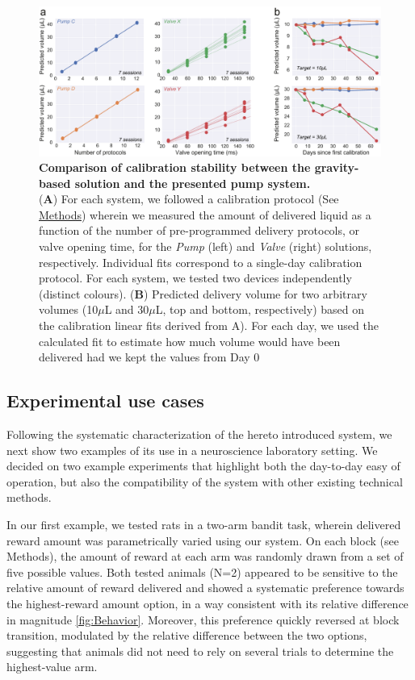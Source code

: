 \begin{figure} 
	\centering
	\includegraphics[width=1.0\linewidth]{Figures/Artboard 2.pdf}
	\caption{\textbf{Comparison of calibration stability between the gravity-based solution and the presented pump system.}\\
		(\textbf{A}) For each system, we followed a calibration protocol (See \hyperref[s:methods]{Methods}) wherein we measured the amount of delivered liquid as a function of the number of pre-programmed delivery protocols, or valve opening time, for the \textit{Pump} (left) and \textit{Valve} (right) solutions, respectively. Individual fits correspond to a single-day calibration protocol. For each system, we tested two devices independently (distinct colours). (\textbf{B}) Predicted delivery volume for two arbitrary volumes (10$\mu$L and 30$\mu$L, top and bottom, respectively) based on the calibration linear fits derived from A). For each day, we used the calculated fit to estimate how much volume would have been delivered had we kept the values from Day 0}
	\label{fig:PumpVsValve} 
\end{figure}


\subsection*{Experimental use cases}

Following the systematic characterization of the hereto introduced system, we next show two examples of its use in a neuroscience laboratory setting. We decided on two example experiments that highlight both the day-to-day easy of operation, but also the compatibility of the system with other existing technical methods.

In our first example, we tested rats in a two-arm bandit task, wherein delivered reward amount was parametrically varied using our system. On each block (see Methods), the amount of reward at each arm was randomly drawn from a set of five possible values. Both tested animals (N=2) appeared to be sensitive to the relative amount of reward delivered and showed a systematic preference towards the highest-reward amount option, in a way consistent with its relative difference in magnitude \ref{fig:Behavior}. Moreover, this preference quickly reversed at block transition, modulated by the relative difference between the two options, suggesting that animals did not need to rely on several trials to determine the highest-value arm.

